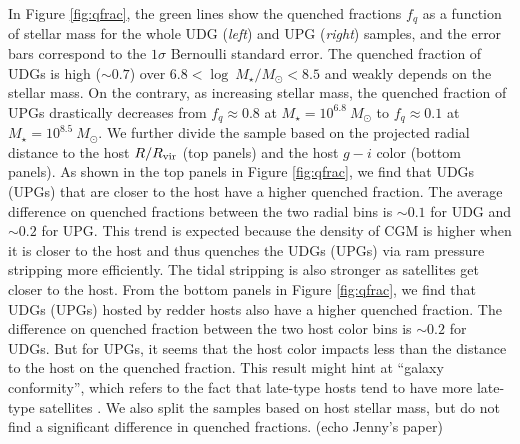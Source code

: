 \documentclass[twocolumn,astrosymb,twocolappendix]{aastex631}
\begin{document}
\begin{CJK*}{UTF8}{gbsn}
In Figure \ref{fig:qfrac}, the green lines show the quenched fractions $f_q$ as a function of stellar mass for the whole UDG (\textit{left}) and UPG (\textit{right}) samples, and the error bars correspond to the $1\sigma$ Bernoulli standard error. The quenched fraction of UDGs is high ($\sim 0.7$) over $6.8 < \log\ M_\star/M_\odot < 8.5$ and weakly depends on the stellar mass. On the contrary, as increasing stellar mass, the quenched fraction of UPGs drastically decreases from $f_q \approx 0.8$ at $M_\star = 10^{6.8}\ M_\odot$ to $f_q \approx 0.1$ at $M_\star = 10^{8.5}\ M_\odot$. We further divide the sample based on the projected radial distance to the host $R/R_{\rm vir}$ (top panels) and the host $g-i$ color (bottom panels). As shown in the top panels in Figure \ref{fig:qfrac}, we find that UDGs (UPGs) that are closer to the host have a higher quenched fraction. The average difference on quenched fractions between the two radial bins is $\sim 0.1$ for UDG and $\sim 0.2$ for UPG. This trend is expected because the density of CGM is higher when it is closer to the host and thus quenches the UDGs (UPGs) via ram pressure stripping more efficiently. The tidal stripping is also stronger as satellites get closer to the host. From the bottom panels in Figure \ref{fig:qfrac}, we find that UDGs (UPGs) hosted by redder hosts also have a higher quenched fraction. The difference on quenched fraction between the two host color bins is $\sim 0.2$ for UDGs. But for UPGs, it seems that the host color impacts less than the distance to the host on the quenched fraction. This result might hint at ``galaxy conformity'', which refers to the fact that late-type hosts tend to have more late-type satellites \citep{Weinmann2006}. We also split the samples based on host stellar mass, but do not find a significant difference in quenched fractions. (echo Jenny's paper)


\end{CJK*}
\end{document}

